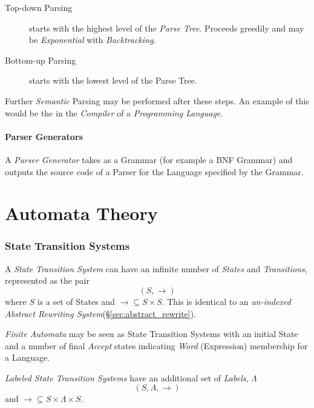 \documentclass{article}
\begin{document}
\begin{description}
    \item[Top-down Parsing]
    starts with the highest level of the \emph{Parse Tree}. Proceeds greedily
    and may be \emph{Exponential} with \emph{Backtracking}.
    \item[Bottom-up Parsing]
    starts with the lowest level of the Parse Tree.
\end{description}

Further \emph{Semantic} Parsing may be performed after these steps. An
example of this would be the in the \emph{Compiler} of a
\emph{Programming Language}.

\subsection{Parser Generators}\label{subsec:parser_generator}

A \emph{Parser Generator} takes as a Grammar (for example a BNF
Grammar) and outputs the source code of a Parser for the Language
specified by the Grammar.

\part{Automata Theory}

\section{State Transition Systems} \label{sec:state_transition_system}
A \emph{State Transition System} can have an infinite number of
\emph{States} and \emph{Transitions}, represented as the pair
\[
    (S,\rightarrow)
\]
where $S$ is a set of States and $\rightarrow \subseteq S \times
S$. This is identical to an \emph{un-indexed Abstract Rewriting
  System}(\S \ref{sec:abstract_rewrite}).

\emph{Finite Automata} may be seen as State Transition Systems with an
initial State and a number of final \emph{Accept} states indicating
\emph{Word} (Expression) membership for a Language.

\emph{Labeled State Transition Systems} have an additional set of
\emph{Labels}, $\Lambda$
\[(S,\Lambda,\rightarrow)\]
and $\rightarrow \subseteq S \times \Lambda \times S$.
\end{document}
